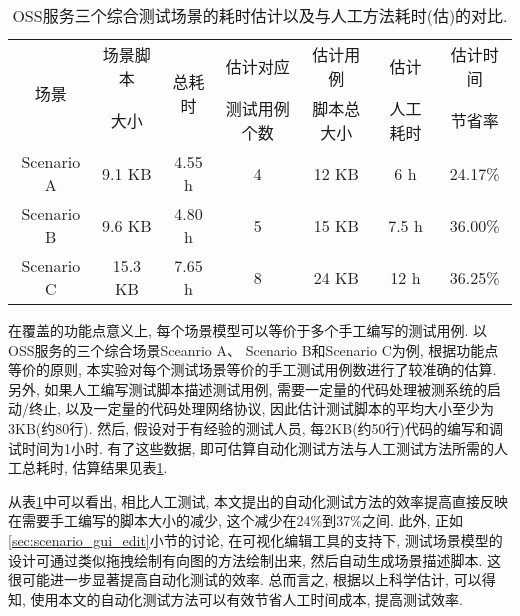         \begin{table}[!htb]
            \centering
            \small
            \begin{tabular}{ccc|ccc|c}
                \toprule
                \multirow{2}{*}{场景} & 场景脚本 & \multirow{2}{*}{总耗时} & 估计对应     & 估计用例   & 估计     & 估计时间  \\
                                      & 大小     &                         & 测试用例个数 & 脚本总大小 & 人工耗时 & 节省率 \\
                \midrule
                Scenario A & 9.1 KB & 4.55 h & 4 & 12 KB & 6 h & 24.17\% \\
                Scenario B & 9.6 KB & 4.80 h & 5 & 15 KB & 7.5 h & 36.00\% \\
                Scenario C & 15.3 KB & 7.65 h & 8 & 24 KB & 12 h & 36.25\% \\
                \bottomrule
            \end{tabular}
            \caption{OSS服务三个综合测试场景的耗时估计以及与人工方法耗时(估)的对比.}
            \label{tab:efficiency_esti}
        \end{table}
        
        在覆盖的功能点意义上, 每个场景模型可以等价于多个手工编写的测试用例. 以OSS服务的三个综合场景Sceanrio A、 Scenario B和Scenario C为例, 根据功能点等价的原则, 本实验对每个测试场景等价的手工测试用例数进行了较准确的估算. 另外, 如果人工编写测试脚本描述测试用例, 需要一定量的代码处理被测系统的启动/终止, 以及一定量的代码处理网络协议, 因此估计测试脚本的平均大小至少为3KB(约80行). 然后, 假设对于有经验的测试人员, 每2KB(约50行)代码的编写和调试时间为1小时. 有了这些数据, 即可估算自动化测试方法与人工测试方法所需的人工总耗时, 估算结果见表\ref{tab:efficiency_esti}.
        
        从表\ref{tab:efficiency_esti}中可以看出, 相比人工测试, 本文提出的自动化测试方法的效率提高直接反映在需要手工编写的脚本大小的减少, 这个减少在24\%到37\%之间. 此外, 正如\ref{sec:scenario_gui_edit}小节的讨论, 在可视化编辑工具的支持下, 测试场景模型的设计可通过类似拖拽绘制有向图的方法绘制出来, 然后自动生成场景描述脚本. 这很可能进一步显著提高自动化测试的效率. 总而言之, 根据以上科学估计, 可以得知, 使用本文的自动化测试方法可以有效节省人工时间成本, 提高测试效率.
